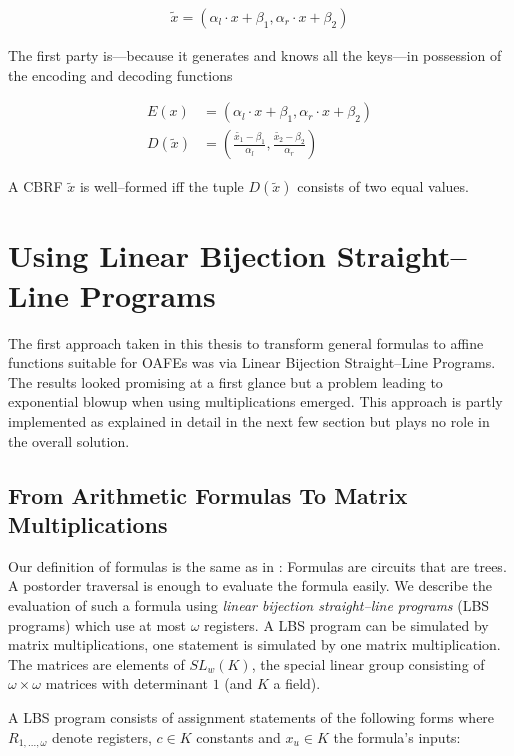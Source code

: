 \documentclass[12pt, a4paper]{article}
\begin{document}
\begin{align}
  \widetilde{x} = (\alpha_l \cdot x + \beta_1, \alpha_r \cdot x + \beta_2)
\end{align}

The first party is---because it generates and knows all the keys---in possession
of the encoding and decoding functions

\begin{align}
  E(x) &= (\alpha_l \cdot x + \beta_1, \alpha_r \cdot x + \beta_2) \\
  D(\widetilde{x}) &= (\frac{\widetilde{x_1} - \beta_1}{\alpha_l},
                       \frac{\widetilde{x_2} - \beta_2}{\alpha_r})
\end{align}

A CBRF $\widetilde{x}$ is well--formed iff the tuple $D(\widetilde{x})$ consists
of two equal values.


\section{Using Linear Bijection Straight--Line Programs}
\label{sec:using-lbs}

The first approach taken in this thesis to transform general formulas to affine
functions suitable for OAFEs was via Linear Bijection Straight--Line Programs.
The results looked promising at a first glance but a problem leading to
exponential blowup when using multiplications emerged. This approach is partly
implemented as explained in detail in the next few section but plays no role in
the overall solution.

\subsection{From Arithmetic Formulas To Matrix Multiplications}
\label{sec:FormulasToMatrixMuls}

Our definition of formulas is the same as in \cite{cleve91}: Formulas are
circuits that are trees. A postorder traversal is enough to evaluate the formula
easily. We describe the evaluation of such a formula using \emph{linear
bijection straight--line programs} (LBS programs)\cite{cleve91} which use at
most $\omega$ registers. A LBS program can be simulated by matrix
multiplications, one statement is simulated by one matrix multiplication. The
matrices are elements of $SL_w(K)$, the special linear group consisting of
$\omega \times \omega$ matrices with determinant $1$ (and $K$ a field).

A LBS program consists of assignment statements of the following
forms where $R_{1,...,\omega}$ denote registers, $c \in K$ constants and $x_u
\in K$ the formula's inputs:
\end{document}
